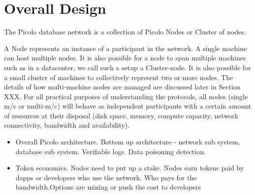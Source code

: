 \section{Overall Design}

The Picolo database network is a collection of Picolo Nodes or Cluster of nodes.

A Node represents an instance of a participant in the network. A single machine
can host multiple nodes. It is also possible for a node to span multiple
machines such as in a datacenter, we call such a setup a Cluster-node. It is also possible
for a small cluster of machines to collectively represent two or more nodes.  The details of how
multi-machine nodes are managed are discussed later in Section XXX. For all practical purposes of
understanding the protocols, all nodes (single m/c or multi-m/c) will behave as independent participants with
a certain amount of resources at their disposal (disk space, memory, compute capacity, network connectivity, bandwidth and availability).

    \begin{itemize}
        \item Overall Picolo architecture.
        	Bottom up architecture - network sub system, database sub system. Verifiable logs. Data poisoning detection.
        \item Token economics.
        	Nodes need to put up a stake. Nodes earn tokens paid by dapps or developers who use the network. Who pays for the bandwidth.Options are mining or push the cost to developers
    \end{itemize}


